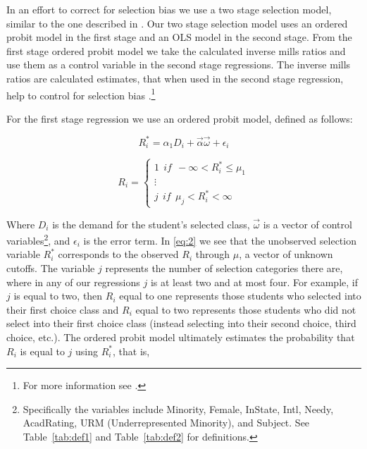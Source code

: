 \documentclass[12pt,a4paper,english,fleqn]{article}
\newcommand{\tablelabel}[1]{Table~\ref{#1}}
\begin{document}
In an effort to correct for selection bias we use a two stage selection model, similar to the one described in \citet{heckman1979sample}. Our two stage selection model uses an ordered probit model in the first stage and an OLS model in the second stage. From the first stage ordered probit model we take the calculated inverse mills ratios and use them as a control variable in the second stage regressions. The inverse mills ratios are calculated estimates, that when used in the second stage regression, help to control for selection bias \citep{heckman1979sample}.\footnote{For more information see \citet{greene2002limdep}.}

For the first stage regression we use an ordered probit model, defined as follows:

\setlength{\belowdisplayskip}{5pt} \setlength{\belowdisplayshortskip}{1pt}
\setlength{\abovedisplayskip}{-6pt} \setlength{\abovedisplayshortskip}{1pt}

\begin{equation}\label{eq:1}
R_{i}^{*} = \alpha_{1} D_{i} + \overrightarrow{\alpha} \overrightarrow{\omega} + \epsilon_{i}
\end{equation}

\setlength{\belowdisplayskip}{11pt} \setlength{\belowdisplayshortskip}{1pt}
\setlength{\abovedisplayskip}{-4pt} \setlength{\abovedisplayshortskip}{1pt}

\begin{equation}\label{eq:2}
R_{i} = 
\begin{cases}
  1 \ \ if \ \ - \infty < R_{i}^{*} \leq \mu_{1} \\
  \vdots \\
  j \ \ if \ \ \mu_{j} < R_{i}^{*} < \infty
\end{cases}
\end{equation}

Where $D_{i}$ is the demand for the student's selected class, $\overrightarrow{\omega}$ is a vector of control variables\footnote{Specifically the variables include Minority, Female, InState, Intl, Needy, AcadRating, URM (Underrepresented Minority), and Subject. See \tablelabel{tab:def1} and \tablelabel{tab:def2} for definitions.}, and $\epsilon_{i}$ is the error term. 
In \eqref{eq:2} we see that the unobserved selection variable $R_{i}^{*}$ corresponds to the observed $R_{i}$ through $\mu$, a vector of unknown cutoffs. 
The variable $j$ represents the number of selection categories there are, where in any of our regressions $j$ is at least two and at most four. 
For example, if $j$ is equal to two, then $R_{i}$ equal to one represents those students who selected into their first choice class and $R_{i}$ equal to two represents those students who did not select into their first choice class (instead selecting into their second choice, third choice, etc.). 
The ordered probit model ultimately estimates the probability that $R_{i}$ is equal to $j$ using $R_{i}^{*}$, that is, 
\end{document}
